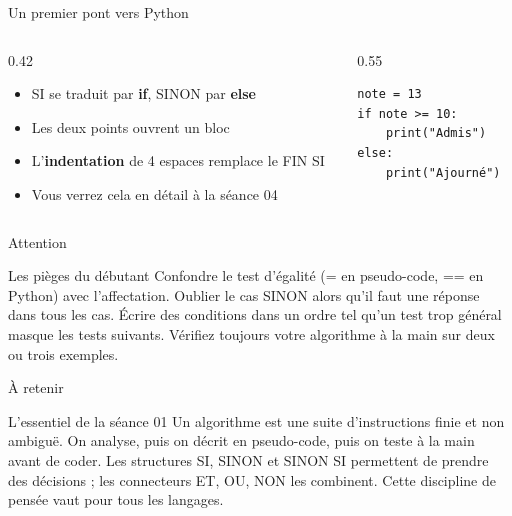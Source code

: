 \documentclass[aspectratio=169,11pt]{beamer}
\begin{document}
\begin{frame}[fragile]{Un premier pont vers Python}
\begin{columns}[t]
\begin{column}{0.42\textwidth}
\begin{itemize}
  \setlength{\itemsep}{1.5pt}\setlength{\parskip}{0pt}
  \item SI se traduit par \textbf{if}, SINON par \textbf{else}
  \item Les deux points ouvrent un bloc
  \item L'\textbf{indentation} de 4 espaces remplace le FIN SI
  \item Vous verrez cela en détail à la séance 04
\end{itemize}
\end{column}
\hspace{0.02\textwidth}
\begin{column}{0.55\textwidth}
\begin{lstlisting}[style=pysmall]
note = 13
if note >= 10:
    print("Admis")
else:
    print("Ajourné")
\end{lstlisting}
\end{column}
\end{columns}
\end{frame}

\begin{frame}{Attention}
\begin{alertblock}{Les pièges du débutant}
Confondre le test d'égalité (= en pseudo-code, == en Python) avec l'affectation. Oublier le cas SINON alors qu'il faut une réponse dans tous les cas. Écrire des conditions dans un ordre tel qu'un test trop général masque les tests suivants. Vérifiez toujours votre algorithme à la main sur deux ou trois exemples.
\end{alertblock}
\end{frame}

\begin{frame}{À retenir}
\begin{block}{L'essentiel de la séance 01}
Un algorithme est une suite d'instructions finie et non ambiguë. On analyse, puis on décrit en pseudo-code, puis on teste à la main avant de coder. Les structures SI, SINON et SINON SI permettent de prendre des décisions ; les connecteurs ET, OU, NON les combinent. Cette discipline de pensée vaut pour tous les langages.
\end{block}
\end{frame}
\end{document}
